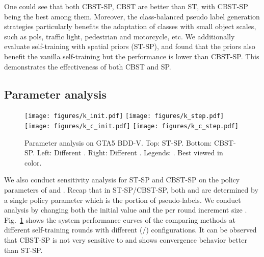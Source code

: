 \documentclass[runningheads]{llncs}
\begin{document}
One could see that both CBST-SP, CBST are better than ST, with CBST-SP being the best among them. Moreover, the class-balanced pseudo label generation strategies particularly benefits the adaptation of classes with small object scales, such as pols, traffic light, pedestrian and motorcycle, etc. We additionally evaluate self-training with spatial priors (ST-SP), and found that the priors also benefit the vanilla self-training but the performance is lower than CBST-SP. This demonstrates the effectiveness of both CBST and SP.

\subsection{Parameter analysis}
\begin{figure}[t]
\centering
\texttt{[image: figures/k\_init.pdf]}
\texttt{[image: figures/k\_step.pdf]}\\
\texttt{[image: figures/k\_c\_init.pdf]}
\texttt{[image: figures/k\_c\_step.pdf]}
\caption{Parameter analysis on GTA5  BDD-V. Top: ST-SP. Bottom: CBST-SP. Left: Different . Right: Different . Legends: . Best viewed in color.}\label{gtabddv_as}
\end{figure}

We also conduct sensitivity analysis for ST-SP and CBST-SP on the policy parameters of  and . Recap that in ST-SP/CBST-SP, both  and  are determined by a single policy parameter  which is the portion of pseudo-labels. We conduct analysis by changing both the initial value  and the per round increment size . Fig.~\ref{gtabddv_as} shows the system performance curves of the comparing methods at different self-training rounds with different (/) configurations. It can be observed that CBST-SP is not very sensitive to  and shows convergence behavior better than ST-SP.
\end{document}
